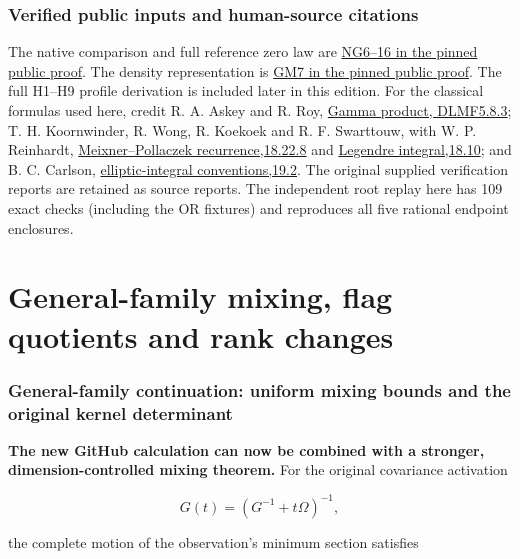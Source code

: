 \documentclass[11pt]{article}
\begin{document}
\section*{Verified public inputs and human-source citations}
The native comparison and full reference zero law are
\href{https://github.com/KokunoYumeto/zeta-function-research-reader/blob/5992ad50c0f2a06921f1fcaded7b4e38097c0739/workbenches/splitzero-tandem/continuations/20260920-original-kernel-mixed-determinants/providers/NATIVE_GAUSSIAN_TRANSFER.tex#L101}{NG6--16 in the pinned public proof}.
The density representation is
\href{https://github.com/KokunoYumeto/zeta-function-research-reader/blob/5992ad50c0f2a06921f1fcaded7b4e38097c0739/workbenches/splitzero-tandem/continuations/20260920-original-kernel-mixed-determinants/providers/GAUSSIAN_EQUILIBRIUM_MOMENTS.tex#L80}{GM7 in the pinned public proof}.
The full H1--H9 profile derivation is included later in this edition.
For the classical formulas used here, credit R. A. Askey and R. Roy,
\href{https://dlmf.nist.gov/5.8.E3}{Gamma product, DLMF5.8.3};
T. H. Koornwinder, R. Wong, R. Koekoek and R. F. Swarttouw, with
W. P. Reinhardt,
\href{https://dlmf.nist.gov/18.22.E8}{Meixner--Pollaczek recurrence,18.22.8}
and \href{https://dlmf.nist.gov/18.10}{Legendre integral,18.10};
and B. C. Carlson,
\href{https://dlmf.nist.gov/19.2}{elliptic-integral conventions,19.2}.
The original supplied verification reports are retained as source reports.
The independent root replay here has 109 exact checks (including the OR
fixtures) and reproduces all five rational endpoint enclosures.

\clearpage\part{General-family mixing, flag quotients and rank changes}
\label{part:8}
\section{General-family continuation: uniform mixing bounds and the original kernel determinant}\label{general-family-continuation-uniform-mixing-bounds-and-the-original-kernel-determinant}

\textbf{The new GitHub calculation can now be combined with a stronger, dimension-controlled mixing theorem.} For the original covariance activation

\[
G(t)=(G^{-1}+t\Omega)^{-1},
\]

the complete motion of the observation's minimum section satisfies
\end{document}
